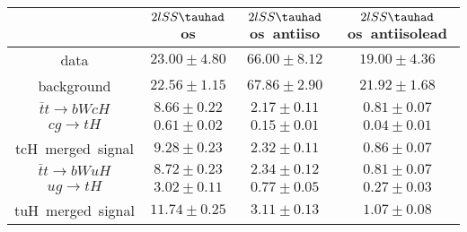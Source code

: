 \centering
\begin{tabular}{|c|c|c|c|} \hline
 & $2lSS\tauhad$ os & $2lSS\tauhad$ os~antiiso & $2lSS\tauhad$ os~antiisolead\\\hline
data & $23.00\pm4.80$ & $66.00\pm8.12$ & $19.00\pm4.36$\\\hline
background & $22.56\pm1.15$ & $67.86\pm2.90$ & $21.92\pm1.68$\\\hline
$\bar{t}t\to bWcH$ & $8.66\pm0.22$ & $2.17\pm0.11$ & $0.81\pm0.07$\\\hline
$cg\to tH$ & $0.61\pm0.02$ & $0.15\pm0.01$ & $0.04\pm0.01$\\\hline
tcH~merged~signal & $9.28\pm0.23$ & $2.32\pm0.11$ & $0.86\pm0.07$\\\hline
$\bar{t}t\to bWuH$ & $8.72\pm0.23$ & $2.34\pm0.12$ & $0.81\pm0.07$\\\hline
$ug\to tH$ & $3.02\pm0.11$ & $0.77\pm0.05$ & $0.27\pm0.03$\\\hline
tuH~merged~signal & $11.74\pm0.25$ & $3.11\pm0.13$ & $1.07\pm0.08$\\\hline
\end{tabular}
